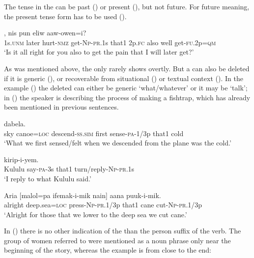 The tense in the  can be past () or present (), but not future. For future meaning, the present tense form has to be used (). 

\ea%
\label{ex:x1531}
,  nis  pun  eliw aaw-owen=i?\\
1s.\textsc{unm} later  hurt-\textsc{nmz} get-\textsc{Np}-\textsc{pr}.1s  that1  2p.\textsc{fc} also  well get-\textsc{fu}.2p=\textsc{qm}\\
\glt`Is it all right for you also to get the pain that I will later get?'
\z


As was mentioned above, the  only rarely shows overtly. But a  can also be deleted if it is generic (), or recoverable from situational () or textual context (). In the example () the deleted  can either be generic `what/whatever' or it may be  `talk'; in () the speaker is describing the process of making a fishtrap, which has already been mentioned in previous sentences.

\ea%
\label{ex:x1561}
\gll [Iinan  aasa=pa  or-omi  kiikir  furew-a-mik  nain]  dabela.  \\
sky  canoe=\textsc{loc} descend-\textsc{ss}.\textsc{sim} first  sense-\textsc{pa}-1/3p that1 cold\\
\glt`What we first sensed/felt when we descended from the plane was the cold.'
\z


\ea%
\label{ex:x1555}
  kirip-i-yem. \\
Kululu  say-\textsc{pa}-3s that1 turn/reply-\textsc{Np}-\textsc{pr}.1s\\
\glt`I reply to what Kululu said.'
\z


\ea%
\label{ex:x1559}
\gll Aria  [malol=pa  ifemak-i-mik  nain]  aana puuk-i-mik.\\
alright  deep.sea=\textsc{loc} press-\textsc{Np}-\textsc{pr}.1/3p  that1 cane cut-\textsc{Np}-\textsc{pr}.1/3p\\
\glt`Alright for those that we lower to the deep sea we cut cane.'
\z


In () there is no other indication of the   than the person suffix of the verb. The group of women referred to were mentioned as a noun phrase only near the beginning of the story, whereas the example is from close to the end:

